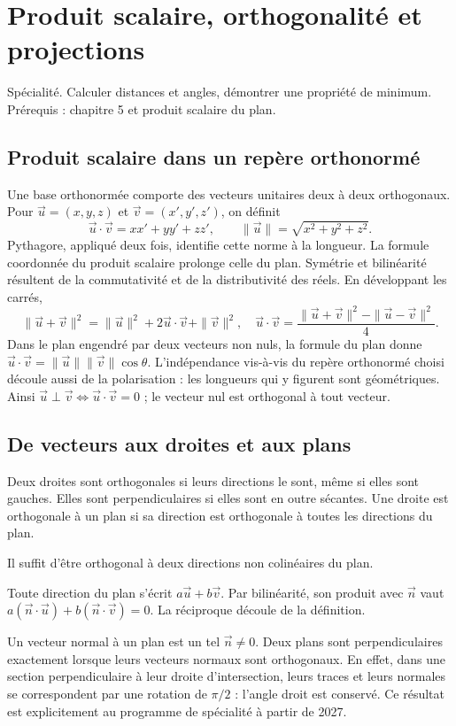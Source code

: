 \documentclass[../cours_tle.tex]{subfiles}
\begin{document}
\setcounter{chapter}{5}
\chapter{Produit scalaire, orthogonalité et projections}
\label{ch:6}
\begin{objectif}
Spécialité. Calculer distances et angles, démontrer une propriété de minimum. Prérequis : chapitre 5 et produit scalaire du plan.
\end{objectif}
\section{Produit scalaire dans un repère orthonormé}
Une base orthonormée comporte des vecteurs unitaires deux à deux orthogonaux. Pour $\vec u=(x,y,z)$ et $\vec v=(x',y',z')$, on définit
\[
\vec u\cdot\vec v=xx'+yy'+zz',\qquad \|\vec u\|=\sqrt{x^2+y^2+z^2}.
\]
Pythagore, appliqué deux fois, identifie cette norme à la longueur. La formule coordonnée du produit scalaire prolonge celle du plan.
Symétrie et bilinéarité résultent de la commutativité et de la distributivité des réels. En développant les carrés,
\[
\|\vec u+\vec v\|^2=\|\vec u\|^2+2\vec u\cdot\vec v+\|\vec v\|^2,
\quad \vec u\cdot\vec v=\frac{\|\vec u+\vec v\|^2-\|\vec u-\vec v\|^2}{4}.
\]
Dans le plan engendré par deux vecteurs non nuls, la formule du plan donne $\vec u\cdot\vec v=\|\vec u\|\|\vec v\|\cos\theta$. L'indépendance vis-à-vis du repère orthonormé choisi découle aussi de la polarisation : les longueurs qui y figurent sont géométriques.
Ainsi $\vec u\perp\vec v\Leftrightarrow\vec u\cdot\vec v=0$ ; le vecteur nul est orthogonal à tout vecteur.
\section{De vecteurs aux droites et aux plans}
Deux droites sont orthogonales si leurs directions le sont, même si elles sont gauches. Elles sont perpendiculaires si elles sont en outre sécantes.
Une droite est orthogonale à un plan si sa direction est orthogonale à toutes les directions du plan.
\begin{propriete}
Il suffit d'être orthogonal à deux directions non colinéaires du plan.
\end{propriete}
\begin{demonstration}
Toute direction du plan s'écrit $a\vec u+b\vec v$. Par bilinéarité, son produit avec $\vec n$ vaut $a(\vec n\cdot\vec u)+b(\vec n\cdot\vec v)=0$.
La réciproque découle de la définition.
\end{demonstration}
Un vecteur normal à un plan est un tel $\vec n\ne0$.
Deux plans sont perpendiculaires exactement lorsque leurs vecteurs normaux sont orthogonaux. En effet, dans une section perpendiculaire à leur droite d'intersection, leurs traces et leurs normales se correspondent par une rotation de $\pi/2$ : l'angle droit est conservé. Ce résultat est explicitement au programme de spécialité à partir de 2027.
\end{document}
